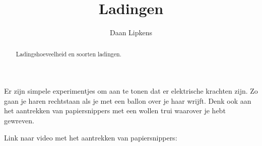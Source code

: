 \documentclass{ximera}
\title{Ladingen}
\author{Daan Lipkens}
\begin{document}
\begin{abstract}
    Ladingshoeveelheid en soorten ladingen.
\end{abstract}
\maketitle

Er zijn simpele experimentjes om aan te tonen dat er elektrische krachten zijn. Zo gaan je haren rechtstaan als je met een ballon over je haar wrijft. Denk ook aan het aantrekken van papiersnippers met een wollen trui waarover je hebt gewreven.
\begin{onlineOnly}
    Link naar video met het aantrekken van papiersnippers: 
\end{onlineOnly}

\end{document}
